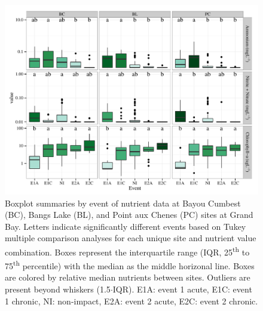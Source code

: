\documentclass[letterpaper,12pt]{article}\usepackage[]{graphicx}\usepackage[]{color}
\makeatletter
\def\maxwidth{ %
  \ifdim\Gin@nat@width>\linewidth
    \linewidth
  \else
    \Gin@nat@width
  \fi
}
\makeatother
\begin{document}
\clearpage

\begin{figure}[!ht]

{\centering \includegraphics[width=\maxwidth]{figs/boxplt_all-1} 

}

\caption[Boxplot summaries by event of nutrient data at Bayou Cumbest (BC), Bangs Lake (BL), and Point aux Chenes (PC) sites at Grand Bay]{Boxplot summaries by event of nutrient data at Bayou Cumbest (BC), Bangs Lake (BL), and Point aux Chenes (PC) sites at Grand Bay.  Letters indicate significantly different events based on Tukey multiple comparison analyses for each unique site and nutrient value combination.  Boxes represent the interquartile range (IQR, 25\textsuperscript{th} to 75\textsuperscript{th} percentile) with the median as the middle horizonal line.  Boxes are colored by relative median nutrients between sites.  Outliers are present beyond whiskers (1.5$\cdot$IQR). E1A: event 1 acute, E1C: event 1 chronic, NI: non-impact, E2A: event 2 acute, E2C: event 2 chronic.}\label{fig:boxplt_all}
\end{figure}
\end{document}
